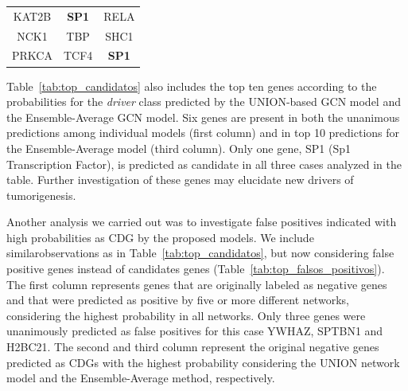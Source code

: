 \begin{table}[!ht]
\begin{tabular}{ccc}
KAT2B                                                                    & \textbf{SP1}                                                          & RELA                                                               \\
NCK1                                                                     & TBP                                                                   & SHC1                                                               \\
PRKCA                                                                    & TCF4                                                                  & \textbf{SP1}                                                       \\ \hline
\end{tabular}
\end{table}

Table~\ref{tab:top_candidatos} also includes the top ten genes according to the probabilities for the \textit{driver} class predicted by the UNION-based GCN model and the Ensemble-Average GCN model. Six genes are present in both the unanimous predictions among individual models (first column) and in top 10 predictions for the Ensemble-Average model (third column). Only one gene, SP1 (Sp1 Transcription Factor), is predicted as candidate in all three cases analyzed in the table. Further investigation of these genes may elucidate new drivers of tumorigenesis.


Another analysis we carried out was to investigate false positives indicated with high probabilities as CDG by the proposed models. We include similarobservations as in Table~\ref{tab:top_candidatos}, but now considering false positive genes instead of candidates genes (Table~\ref{tab:top_falsos_positivos}). The first column represents genes that are originally labeled as negative genes and that were predicted as positive by five or more different networks, considering the highest probability in all networks. Only three genes were unanimously predicted as false positives for this case YWHAZ, SPTBN1 and H2BC21. The second and third column represent the original negative genes predicted as CDGs with the highest probability considering the UNION network model and the Ensemble-Average method, respectively.


